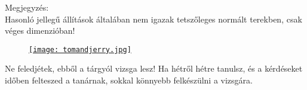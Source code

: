 \documentclass[]{scrartcl}
\newenvironment{megjegyzes}{}{}
\newenvironment{ajanlofig}{\begin{figure}\begin{center}}{
\end{center}\end{figure}}
\newenvironment{ajanlo}{\begin{samepage}}{\end{samepage}}
\begin{document}
\begin{megjegyzes}

Megjegyzés:\\
Hasonló jellegű állítások általában nem igazak tetszőleges normált
terekben, csak véges dimenzióban!

\end{megjegyzes}

\begin{ajanlo}

\begin{ajanlofig}

\href{https://www.youtube.com/watch?v=e8o6rt6o4LA}{\texttt{[image: tomandjerry.jpg]}}

\end{ajanlofig}

Ne feledjétek, ebből a tárgyól vizsga lesz! Ha hétről hétre tanulsz, és
a kérdéseket időben felteszed a tanárnak, sokkal könnyebb felkészülni a
vizsgára.

\end{ajanlo}
\end{document}
